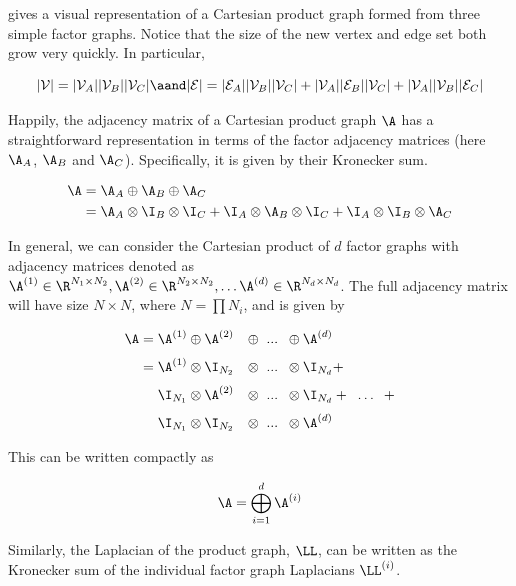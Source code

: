  gives a visual representation of a Cartesian product graph formed from three simple factor graphs. Notice that the size of the new vertex and edge set both grow very quickly. In particular, 

$$
|\mathcal{V}| = |\mathcal{V}_A| |\mathcal{V}_B| |\mathcal{V}_C| \aand |\mathcal{E}| =  |\mathcal{E}_A| |\mathcal{V}_B| |\mathcal{V}_C| + |\mathcal{V}_A| |\mathcal{E}_B| |\mathcal{V}_C| + |\mathcal{V}_A| |\mathcal{V}_B| |\mathcal{E}_C|
$$

Happily, the adjacency matrix of a Cartesian product graph $\A$ has a straightforward representation in terms of the factor adjacency matrices (here $\A_A$, $\A_B$ and $\A_C$). Specifically, it is given by their Kronecker sum. 

\begin{align}
    \A &= \A_A \oplus \A_B \oplus \A_C \notag \\
    &= \A_A \otimes \I_B \otimes \I_C  + \I_A \otimes \A_B \otimes \I_C + \I_A \otimes \I_B \otimes \A_C
\end{align}

In general, we can consider the Cartesian product of $d$ factor graphs with adjacency matrices denoted as $\A^{(1)} \in \R^{N_1 \times N_2}, \A^{(2)} \in \R^{N_2 \times N_2}, \dots \A^{(d)} \in \R^{N_d \times N_d}$. The full adjacency matrix will have size $N \times N$, where $N = \prod N_i$, and is given by  

\begin{alignat}{4}
    \A = \A^{(1)} & \oplus \A^{(2)} & \oplus \;\; ... \;\; & \oplus \A^{(d)} \notag \\[0.1cm]
    = \A^{(1)} & \otimes \I_{N_2} & \otimes \;\; ... \;\; & \otimes \I_{N_d} +  \notag \\[0.1cm]
    \I_{N_1} & \otimes \A^{(2)} & \otimes \;\; ... \;\; & \otimes \I_{N_d} + \;\; \ldots \;\; +  \notag \\[0.1cm]
    \I_{N_1} & \otimes \I_{N_2} & \otimes \;\; ... \;\; & \otimes \A^{(d)}  
\end{alignat}
    
This can be written compactly as 

\begin{equation}
    \A = \bigoplus_{i=1}^d  \A^{(i)}
\end{equation}

Similarly, the Laplacian of the product graph, $\LL$, can be written as the Kronecker sum of the individual factor graph Laplacians $\LL^{(i)}$. 

